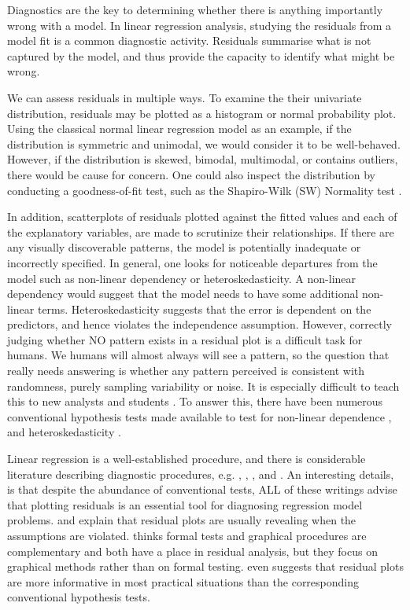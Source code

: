 \documentclass[]{interact}
\theoremstyle{plain}%
\theoremstyle{definition}
\theoremstyle{remark}
\begin{document}
Diagnostics are the key to determining whether there is anything
importantly wrong with a model. In linear regression analysis, studying
the residuals from a model fit is a common diagnostic activity.
Residuals summarise what is not captured by the model, and thus provide
the capacity to identify what might be wrong.

We can assess residuals in multiple ways. To examine the their
univariate distribution, residuals may be plotted as a histogram or
normal probability plot. Using the classical normal linear regression
model as an example, if the distribution is symmetric and unimodal, we
would consider it to be well-behaved. However, if the distribution is
skewed, bimodal, multimodal, or contains outliers, there would be cause
for concern. One could also inspect the distribution by conducting a
goodness-of-fit test, such as the Shapiro-Wilk (SW) Normality test
\citep{shapiro1965analysis}.

In addition, scatterplots of residuals plotted against the fitted values
and each of the explanatory variables, are made to scrutinize their
relationships. If there are any visually discoverable patterns, the
model is potentially inadequate or incorrectly specified. In general,
one looks for noticeable departures from the model such as non-linear
dependency or heteroskedasticity. A non-linear dependency would suggest
that the model needs to have some additional non-linear terms.
Heteroskedasticity suggests that the error is dependent on the
predictors, and hence violates the independence assumption. However,
correctly judging whether NO pattern exists in a residual plot is a
difficult task for humans. We humans will almost always will see a
pattern, so the question that really needs answering is whether any
pattern perceived is consistent with randomness, purely sampling
variability or noise. It is especially difficult to teach this to new
analysts and students \citep{loy2021bringing}. To answer this, there
have been numerous conventional hypothesis tests made available to test
for non-linear dependence \citep[e.g.][]{ramsey_tests_1969}, and
heteroskedasticity \citep[e.g.][]{breusch_simple_1979}.

Linear regression is a well-established procedure, and there is
considerable literature describing diagnostic procedures, e.g.
\citet{draper1998applied}, \citet{montgomery1982introduction},
\citet{belsley_regression_1980}, \citet{cook_applied_1999} and
\citet{cook1982residuals}. An interesting details, is that despite the
abundance of conventional tests, ALL of these writings advise that
plotting residuals is an essential tool for diagnosing regression model
problems. \citet{draper1998applied} and \citet{belsley_regression_1980}
explain that residual plots are usually revealing when the assumptions
are violated. \citet{cook_applied_1999} thinks formal tests and
graphical procedures are complementary and both have a place in residual
analysis, but they focus on graphical methods rather than on formal
testing. \citet{montgomery1982introduction} even suggests that residual
plots are more informative in most practical situations than the
corresponding conventional hypothesis tests.
\end{document}
